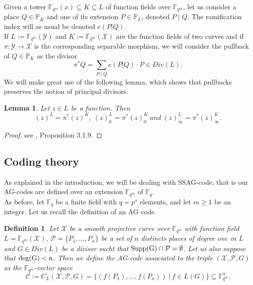 \documentclass[10pt]{article}
\newtheorem{def1}{Definition}[]
\newtheorem{lem1}{Lemma}[]
\newcommand{\s}{\vspace{0.3cm}}
\newcommand{\cd}{\cdot}
\newcommand{\fqm}{\mathbb{F}_{q^m}}
\newcommand{\fq}{\mathbb{F}_q}
\newcommand{\su}{\subseteq}
\newcommand{\X}{\mathcal{X}}
\newcommand{\Y}{\mathcal{Y}}
\newcommand{\PR}{\mathcal{P}}
\begin{document}
\s

Given a tower $\fqm(x) \su K \su L$ of function fields over $\fqm$, let us consider a place  $Q \in \mathbb{P}_K$ and one of its extension $P \in \mathbb{P}_L$, denoted $P\mid Q$. The ramification index will as usual be denoted $e(P|Q)$. \\
If $L := \fqm(\Y)$ and $K:=\fqm(\X)$ are the function fields of two curves and if $\pi : \Y \rightarrow \X$ is the corresponding separable morphism, we will consider the pullback of $Q \in \mathbb{P}_K$ as the divisor
\[\pi^*Q = \sum\limits_{P \mid Q} e(P|Q) \cd P \in Div(L).\]
We will make great use of the following lemma, which shows that pullbacks preserves the notion of principal divisors.

\s

\begin{lem1} \label{tiréarr}
Let $z \in L$ be a function. Then 
\[(z)^L = \pi^*(z)^K, \ (z)^L_0 = \pi^*(z)_0^K \ and \ (z)^L_{\infty} = \pi^*(z)^K_{\infty}.\]
\end{lem1} 

\s

\begin{proof}
see \cite{Sti}, Proposition 3.1.9.
\end{proof}

\s

\subsection{Coding theory}

\s

As explained in the introduction, we will be dealing with SSAG-code, that is our AG-codes are defined over an extension $\fqm$ of $\fq$. \\
As before, let $\fq$ be a finite field with $q=p^s$ elements, and let $m \geq 1$ be an integer. Let us recall the definition of an AG code.

\s

\begin{def1}
Let $\X$ be a smooth projective curve over $\fqm$ with function field $L = \fqm(\X)$, $\PR = \{P_1,...,P_n\}$ be a set of $n$ distincts places of degree one in $L$  and $G \in Div(L)$ be a divisor sucht that $\rm{Supp}(G) \cap \PR = \emptyset$. Let us also suppose that $\rm{deg}(G)<n$. Then we define the AG-code associated to the triple $(\X,\PR,G)$ as the $\fqm$-vector space
\[\mathcal{C} := C_L(\X,\PR,G) = \{ (f(P_1),...,f(P_n)) \ | \ f \in L(G)\} \su \fqm^n.\]
\end{def1}
\end{document}
